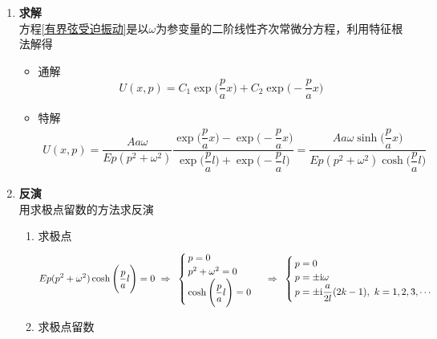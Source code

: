 \begin{enumerate}
	\item \textbf{求解}\\
	方程\eqref{有界弦受迫振动}是以$\omega$为参变量的二阶线性齐次常微分方程，利用特征根法解得
	\begin{itemize}
		\item 通解
		\begin{equation}
			U(x,p) = C_1 \exp\Bigg(\dfrac{p}{a} x\Bigg) +  C_2 \exp\Bigg(-\dfrac{p}{a} x\Bigg) 
		\end{equation}
		\item 特解
		\begin{align}
			U(x, p) = \dfrac{Aa\omega}{Ep(p^2 + \omega^2)} \dfrac{\exp\Bigg(\dfrac{p}{a} x\Bigg) - \exp\Bigg(-\dfrac{p}{a} x\Bigg)}{\exp\Bigg(\dfrac{p}{a} l\Bigg) + \exp\Bigg(-\dfrac{p}{a} l\Bigg)} = \dfrac{Aa\omega \sinh \Bigg(\dfrac{p}{a}x\Bigg)}{Ep(p^2 + \omega^2)\cosh \Bigg(\dfrac{p}{a}l\Bigg)}
		\end{align}
	\end{itemize}
	
	\item \textbf{反演}\\
	用求极点留数的方法求反演
	\begin{enumerate}[1. ]
		\item 求极点
		\[
		Ep(p^2 + \omega^2)\cosh \Bigg(\dfrac{p}{a}l\Bigg) = 0 \,\, \Rightarrow \,\, \,
		\begin{cases}
			\, p = 0\\
			\, p^2 + \omega^2 = 0\\
			\, \cosh \Bigg(\dfrac{p}{a}l\Bigg) = 0
		\end{cases}
		\, \, \Rightarrow \,\,\,
		\begin{cases}
			\, p = 0\\
			\, p = \pm {\rm{i}} \omega \\
			\, p = \pm {\rm{i}} \dfrac{a}{2l}(2k - 1),\,\, k=1,2,3,\cdots
		\end{cases}
		\]
		
		\item 求极点留数
		

\end{enumerate}
\end{enumerate}
